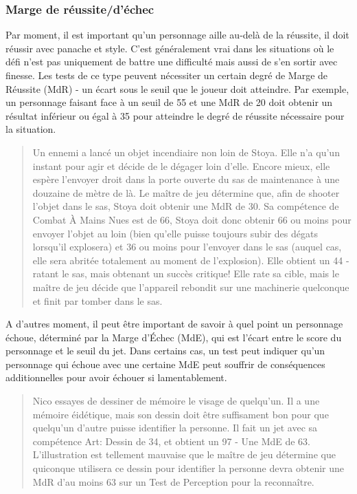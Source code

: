 \subsubsection{Marge de réussite/d'échec} \label{sec:marg-succ} 

Par moment, il est important qu'un personnage aille au-delà de la réussite, il doit réussir avec panache et style. C'est généralement vrai dans les situations où le défi n'est pas uniquement de battre une difficulté mais aussi de s'en sortir avec finesse. Les tests de ce type peuvent nécessiter un certain degré de Marge de Réussite (MdR) - un écart sous le seuil que le joueur doit atteindre. Par exemple, un personnage faisant face à un seuil de 55 et une MdR de 20 doit obtenir un résultat inférieur ou égal à 35 pour atteindre le degré de réussite nécessaire pour la situation. 

\begin{quotation} Un ennemi a lancé un objet incendiaire non loin de Stoya. Elle n'a qu'un instant pour agir et décide de le dégager loin d'elle. Encore mieux, elle espère l'envoyer droit dans la porte ouverte du sas de maintenance à une douzaine de mètre de là. Le maître de jeu détermine que, afin de shooter l'objet dans le sas, Stoya doit obtenir une MdR de 30. Sa compétence de Combat À Mains Nues est de 66, Stoya doit donc obtenir 66 ou moins pour envoyer l'objet au loin (bien qu'elle puisse toujours subir des dégats lorsqu'il explosera) et 36 ou moins pour l'envoyer dans le sas (auquel cas, elle sera abritée totalement au moment de l'explosion). Elle obtient un 44 - ratant le sas, mais obtenant un succès critique! Elle rate sa cible, mais le maître de jeu décide que l'appareil rebondit sur une machinerie quelconque et finit par tomber dans le sas. \end{quotation} 

A d'autres moment, il peut être important de savoir à quel point un personnage échoue, déterminé par la Marge d'Échec (MdE), qui est l'écart entre le score du personnage et le seuil du jet. Dans certains cas, un test peut indiquer qu'un personnage qui échoue avec une certaine MdE peut souffrir de conséquences additionnelles pour avoir échouer si lamentablement. 

\begin{quotation} Nico essayes de dessiner de mémoire le visage de quelqu'un. Il a une mémoire éidétique, mais son dessin doit être suffisament bon pour que quelqu'un d'autre puisse identifier la personne. Il fait un jet avec sa compétence Art: Dessin de 34, et obtient un 97 - Une MdE de 63. L'illustration est tellement mauvaise que le maître de jeu détermine que quiconque utilisera ce dessin pour identifier la personne devra obtenir une MdR d'au moins 63 sur un Test de Perception pour la reconnaître. \end{quotation} 

